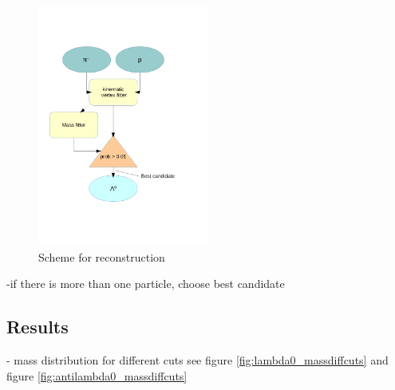 		\begin{figure}
			\centering
				\includegraphics[width=0.50\textwidth]{./plots/combineLambda0.pdf}
			\caption{Scheme for \lam reconstruction}
			\label{fig:lambda_scheme}
		\end{figure}
		
		-if there is more than one particle, choose best candidate
		
	\subsection{Results}
	
		- mass distribution for different cuts see figure \ref{fig:lambda0_massdiffcuts} and figure \ref{fig:antilambda0_massdiffcuts}
		
